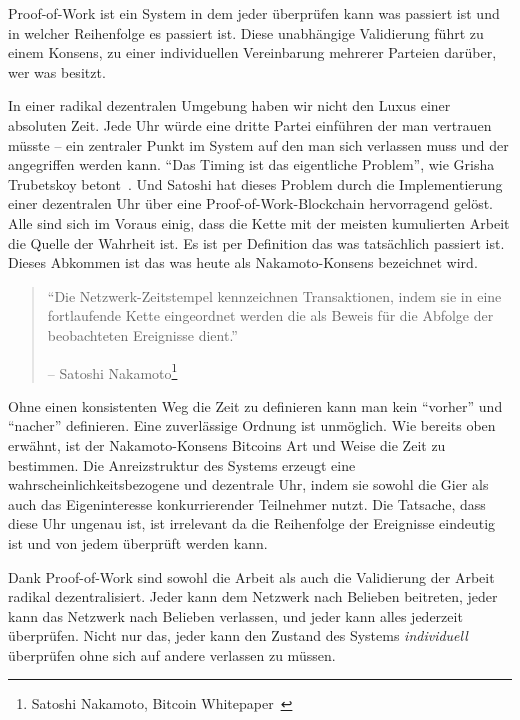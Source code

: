 Proof-of-Work ist ein System in dem jeder überprüfen kann was passiert ist und
in welcher Reihenfolge es passiert ist. Diese unabhängige Validierung führt zu
einem Konsens, zu einer individuellen Vereinbarung mehrerer Parteien darüber,
wer was besitzt.

In einer radikal dezentralen Umgebung haben wir nicht den Luxus einer absoluten
Zeit. Jede Uhr würde eine dritte Partei einführen der man vertrauen müsste --
ein zentraler Punkt im System auf den man sich verlassen muss und der
angegriffen werden kann. \enquote{Das Timing ist das eigentliche Problem}, wie
Grisha Trubetskoy betont~\cite{pow-clock}. Und Satoshi hat dieses Problem durch
die Implementierung einer dezentralen Uhr über eine Proof-of-Work-Blockchain
hervorragend gelöst. Alle sind sich im Voraus einig, dass die Kette mit der
meisten kumulierten Arbeit die Quelle der Wahrheit ist. Es ist per Definition
das was tatsächlich passiert ist. Dieses Abkommen ist das was heute als
Nakamoto-Konsens bezeichnet wird.

\begin{quotation}\begin{samepage}
\enquote{Die Netzwerk-Zeitstempel kennzeichnen Transaktionen, indem sie in eine
fortlaufende Kette eingeordnet werden die als Beweis für die Abfolge der
beobachteten Ereignisse dient.}
\begin{flushright} -- Satoshi Nakamoto\footnote{Satoshi Nakamoto, Bitcoin Whitepaper~\cite{whitepaper}}
\end{flushright}\end{samepage}\end{quotation}

Ohne einen konsistenten Weg die Zeit zu definieren kann man kein
\enquote{vorher} und \enquote{nacher} definieren. Eine zuverlässige Ordnung ist
unmöglich. Wie bereits oben erwähnt, ist der Nakamoto-Konsens Bitcoins Art und
Weise die Zeit zu bestimmen. Die Anreizstruktur des Systems erzeugt eine
wahrscheinlichkeitsbezogene und dezentrale Uhr, indem sie sowohl die Gier als
auch das Eigeninteresse konkurrierender Teilnehmer nutzt. Die Tatsache, dass
diese Uhr ungenau ist, ist irrelevant da die Reihenfolge der Ereignisse
eindeutig ist und von jedem überprüft werden kann.

Dank Proof-of-Work sind sowohl die Arbeit als auch die Validierung der
Arbeit radikal dezentralisiert. Jeder kann dem Netzwerk nach Belieben beitreten,
jeder kann das Netzwerk nach Belieben verlassen, und jeder kann alles jederzeit
überprüfen. Nicht nur das, jeder kann den Zustand des Systems
\textit{individuell} überprüfen ohne sich auf andere verlassen zu müssen.

